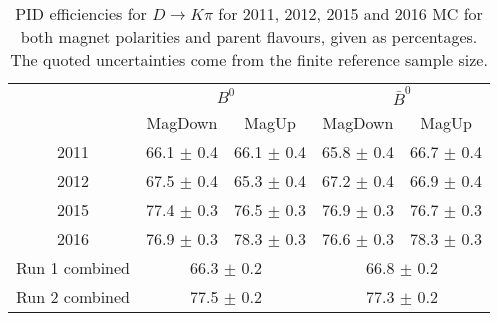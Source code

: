 \begin{table}[H]
    \centering
    \begin{tabular}{ccccc}
        \toprule
        & \multicolumn{2}{c}{$B^0$} &  \multicolumn{2}{c}{$\bar{B}^0$}\\
        & MagDown & MagUp & MagDown & MagUp\\
        \midrule
2011 & 66.1 $\pm$ 0.4 & 66.1 $\pm$ 0.4 & 65.8 $\pm$ 0.4 & 66.7 $\pm$ 0.4 \\
2012 & 67.5 $\pm$ 0.4 & 65.3 $\pm$ 0.4 & 67.2 $\pm$ 0.4 & 66.9 $\pm$ 0.4 \\
2015 & 77.4 $\pm$ 0.3 & 76.5 $\pm$ 0.3 & 76.9 $\pm$ 0.3 & 76.7 $\pm$ 0.3 \\
2016 & 76.9 $\pm$ 0.3 & 78.3 $\pm$ 0.3 & 76.6 $\pm$ 0.3 & 78.3 $\pm$ 0.3 \\
        \midrule
Run 1 combined & \multicolumn{2}{c}{66.3 $\pm$ 0.2} & \multicolumn{2}{c}{66.8 $\pm$ 0.2} \\
Run 2 combined & \multicolumn{2}{c}{77.5 $\pm$ 0.2} & \multicolumn{2}{c}{77.3 $\pm$ 0.2} \\
        \bottomrule
    \end{tabular}
    \caption{PID efficiencies for $D \to K\pi$ for 2011, 2012, 2015 and 2016 MC for both magnet polarities and parent flavours, given as percentages. The quoted  uncertainties come from the finite reference sample size.}
\label{tab:PID_efficiency_Kpi}
\end{table}
